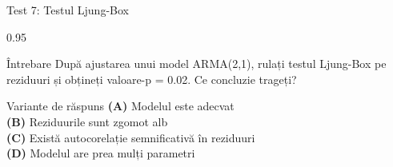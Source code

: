 \documentclass[9pt, aspectratio=169, t]{beamer}
\begin{document}
\begin{frame}{Test 7: Testul Ljung-Box}
    \begin{cminipage}{0.95\textwidth}
    \begin{alertblock}{Întrebare}
        După ajustarea unui model ARMA(2,1), rulați testul Ljung-Box pe reziduuri și obțineți valoare-p = 0.02. Ce concluzie trageți?
    \end{alertblock}

    \vspace{0.5cm}
    \begin{block}{Variante de răspuns}
    \textcolor{MainBlue}{\textbf{(A)}} Modelul este adecvat\\[3pt]
    \textcolor{MainBlue}{\textbf{(B)}} Reziduurile sunt zgomot alb\\[3pt]
    \textcolor{MainBlue}{\textbf{(C)}} Există autocorelație semnificativă în reziduuri\\[3pt]
    \textcolor{MainBlue}{\textbf{(D)}} Modelul are prea mulți parametri
    \end{block}
    \end{cminipage}
\end{frame}
\end{document}
